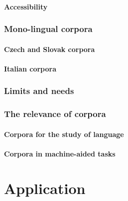 \documentclass[
  a4paper,
  twoside,
  12pt,
  chapterprefix=false,
  bibliography=totocnumbered,
  listof=flat]{scrbook}
\begin{document}
\hypertarget{accessibility}{%
\subsection{Accessibility}\label{accessibility}}

\hypertarget{mono-lingual-corpora}{%
\section{Mono-lingual corpora}\label{mono-lingual-corpora}}

\hypertarget{czech-and-slovak-corpora}{%
\subsection{Czech and Slovak corpora}\label{czech-and-slovak-corpora}}

\hypertarget{italian-corpora}{%
\subsection{Italian corpora}\label{italian-corpora}}

\hypertarget{limits-and-needs}{%
\section{Limits and needs}\label{limits-and-needs}}

\hypertarget{the-relevance-of-corpora}{%
\section{The relevance of corpora}\label{the-relevance-of-corpora}}

\hypertarget{corpora-for-the-study-of-language}{%
\subsection{Corpora for the study of language}\label{corpora-for-the-study-of-language}}

\hypertarget{corpora-in-machine-aided-tasks}{%
\subsection{Corpora in machine-aided tasks}\label{corpora-in-machine-aided-tasks}}

\part{Application}
\end{document}

